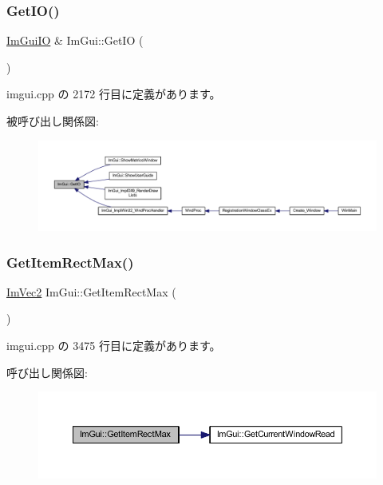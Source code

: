 \subsubsection{\texorpdfstring{Get\+I\+O()}{GetIO()}}
{\footnotesize\ttfamily \mbox{\hyperlink{struct_im_gui_i_o}{Im\+Gui\+IO}} \& Im\+Gui\+::\+Get\+IO (\begin{DoxyParamCaption}{ }\end{DoxyParamCaption})}



 imgui.\+cpp の 2172 行目に定義があります。

被呼び出し関係図\+:\nopagebreak
\begin{figure}[H]
\begin{center}
\leavevmode
\includegraphics[width=350pt]{namespace_im_gui_a3179e560812f878f3961ce803a5d9302_icgraph}
\end{center}
\end{figure}
\mbox{\label{namespace_im_gui_a3d260209b8dc25a2c942e8cfd1ed0e51}} 
\subsubsection{\texorpdfstring{Get\+Item\+Rect\+Max()}{GetItemRectMax()}}
{\footnotesize\ttfamily \mbox{\hyperlink{struct_im_vec2}{Im\+Vec2}} Im\+Gui\+::\+Get\+Item\+Rect\+Max (\begin{DoxyParamCaption}{ }\end{DoxyParamCaption})}



 imgui.\+cpp の 3475 行目に定義があります。

呼び出し関係図\+:\nopagebreak
\begin{figure}[H]
\begin{center}
\leavevmode
\includegraphics[width=350pt]{namespace_im_gui_a3d260209b8dc25a2c942e8cfd1ed0e51_cgraph}
\end{center}
\end{figure}
\mbox{\label{namespace_im_gui_a65b24b72ec0e8444c705cebf3e91f570}} 

